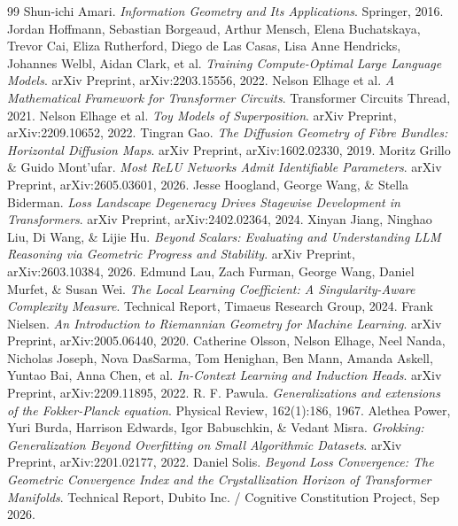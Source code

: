 \documentclass[11pt,twocolumn]{article}
\begin{document}
\begin{thebibliography}{99}
 Shun-ichi Amari. \textit{Information Geometry and Its Applications}. Springer, 2016.
 Jordan Hoffmann, Sebastian Borgeaud, Arthur Mensch, Elena Buchatskaya, Trevor Cai, Eliza Rutherford, Diego de Las Casas, Lisa Anne Hendricks, Johannes Welbl, Aidan Clark, et al. \textit{Training Compute-Optimal Large Language Models}. arXiv Preprint, arXiv:2203.15556, 2022.
 Nelson Elhage et al. \textit{A Mathematical Framework for Transformer Circuits}. Transformer Circuits Thread, 2021.
 Nelson Elhage et al. \textit{Toy Models of Superposition}. arXiv Preprint, arXiv:2209.10652, 2022.
 Tingran Gao. \textit{The Diffusion Geometry of Fibre Bundles: Horizontal Diffusion Maps}. arXiv Preprint, arXiv:1602.02330, 2019.
 Moritz Grillo \& Guido Mont'ufar. \textit{Most ReLU Networks Admit Identifiable Parameters}. arXiv Preprint, arXiv:2605.03601, 2026.
 Jesse Hoogland, George Wang, \& Stella Biderman. \textit{Loss Landscape Degeneracy Drives Stagewise Development in Transformers}. arXiv Preprint, arXiv:2402.02364, 2024.
 Xinyan Jiang, Ninghao Liu, Di Wang, \& Lijie Hu. \textit{Beyond Scalars: Evaluating and Understanding LLM Reasoning via Geometric Progress and Stability}. arXiv Preprint, arXiv:2603.10384, 2026.
 Edmund Lau, Zach Furman, George Wang, Daniel Murfet, \& Susan Wei. \textit{The Local Learning Coefficient: A Singularity-Aware Complexity Measure}. Technical Report, Timaeus Research Group, 2024.
 Frank Nielsen. \textit{An Introduction to Riemannian Geometry for Machine Learning}. arXiv Preprint, arXiv:2005.06440, 2020.
 Catherine Olsson, Nelson Elhage, Neel Nanda, Nicholas Joseph, Nova DasSarma, Tom Henighan, Ben Mann, Amanda Askell, Yuntao Bai, Anna Chen, et al. \textit{In-Context Learning and Induction Heads}. arXiv Preprint, arXiv:2209.11895, 2022.
 R. F. Pawula. \textit{Generalizations and extensions of the Fokker-Planck equation}. Physical Review, 162(1):186, 1967.
 Alethea Power, Yuri Burda, Harrison Edwards, Igor Babuschkin, \& Vedant Misra. \textit{Grokking: Generalization Beyond Overfitting on Small Algorithmic Datasets}. arXiv Preprint, arXiv:2201.02177, 2022.
 Daniel Solis. \textit{Beyond Loss Convergence: The Geometric Convergence Index and the Crystallization Horizon of Transformer Manifolds}. Technical Report, Dubito Inc. / Cognitive Constitution Project, Sep 2026.

\end{thebibliography}
\end{document}
